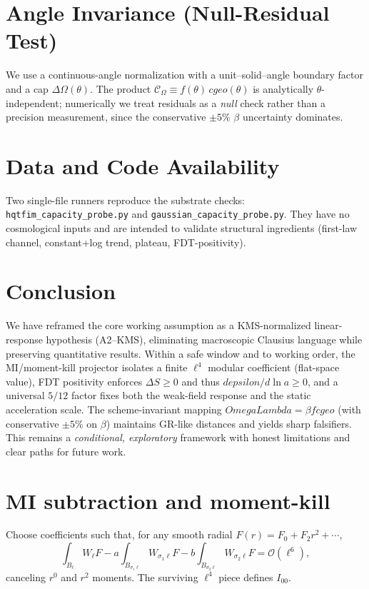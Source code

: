 \documentclass[aps,prd,onecolumn,superscriptaddress,nofootinbib]{revtex4-2}
\def\OmL{OmegaLambda}%
\def\cgeo{cgeo}%
\def\eps{epsilon}%
\def\Omega_\Lambda{OmegaLambda}%
\providecommand{\OmL}{\Omega_\Lambda}
\providecommand{\cgeo}{c_{\rm geo}}
\providecommand{\eps}{\varepsilon}
\begin{document}
\section{Angle Invariance (Null-Residual Test)}
\label{sec:theta}
We use a continuous-angle normalization with a unit--solid--angle boundary factor and a cap \(\Delta\Omega(\theta)\). The product \(\mathcal C_\Omega\equiv f(\theta)\, \cgeo(\theta)\) is analytically \(\theta\)-independent; numerically we treat residuals as a \emph{null} check rather than a precision measurement, since the conservative \(\pm 5\%\) \(\beta\) uncertainty dominates.

\section{Data and Code Availability}
\label{sec:data}
Two single-file runners reproduce the substrate checks: \texttt{hqtfim\_capacity\_probe.py} and \texttt{gaussian\_capacity\_probe.py}. They have no cosmological inputs and are intended to validate structural ingredients (first-law channel, constant+log trend, plateau, FDT-positivity).

\section{Conclusion}
We have reframed the core working assumption as a KMS-normalized linear-response hypothesis (A2--KMS), eliminating macroscopic Clausius language while preserving quantitative results. Within a safe window and to working order, the MI/moment-kill projector isolates a finite \(\ell^4\) modular coefficient (flat-space value), FDT positivity enforces \(\Delta S\ge 0\) and thus \(d\eps/d\ln a\ge 0\), and a universal \(5/12\) factor fixes both the weak-field response and the static acceleration scale. The scheme-invariant mapping \(\OmL=\beta f \cgeo\) (with conservative \(\pm 5\%\) on \(\beta\)) maintains GR-like distances and yields sharp falsifiers. This remains a \emph{conditional, exploratory} framework with honest limitations and clear paths for future work.

\appendix

\section{MI subtraction and moment-kill}
\label{app:MI}
Choose coefficients such that, for any smooth radial \(F(r)=F_0+F_2 r^2+\cdots\),
\[
\int_{B_\ell}W_\ell F - a\!\int_{B_{\sigma_1\ell}}W_{\sigma_1\ell}F - b\!\int_{B_{\sigma_2\ell}}W_{\sigma_2\ell}F
=\mathcal O(\ell^6),
\]
canceling \(r^0\) and \(r^2\) moments. The surviving \(\ell^4\) piece defines \(I_{00}\).
\end{document}
